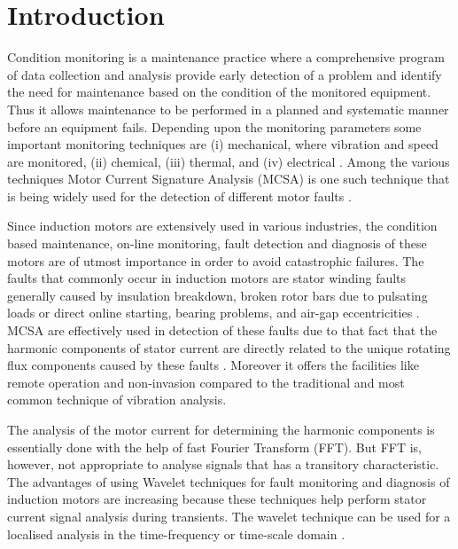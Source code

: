 \documentclass[conference]{IEEEtran}
\begin{document}
%
\IEEEpeerreviewmaketitle

\section{Introduction}
Condition monitoring is a maintenance practice where a comprehensive program of data collection and analysis provide early detection of a problem and identify the need for maintenance based on the condition of the monitored equipment. Thus it allows maintenance to be performed in a planned and systematic manner before an equipment fails. Depending upon the monitoring parameters some important monitoring techniques are (i) mechanical, where vibration and speed are monitored, (ii) chemical, (iii) thermal, and (iv) electrical \cite{Penman}. Among the various techniques Motor Current Signature Analysis (MCSA) is one such technique that is being widely used for the detection of different motor faults \cite{00897122-6}. 

Since induction motors are extensively used in various industries, the condition based maintenance, on-line monitoring, fault detection and diagnosis of these motors are of utmost importance in order to avoid catastrophic failures. The faults that commonly occur in induction motors are stator winding faults generally caused by insulation breakdown, broken rotor bars due to pulsating loads or direct online starting, bearing problems, and air-gap eccentricities \cite{rps6}. MCSA are effectively used in detection of these faults due to that fact that the harmonic components of stator current are directly related to the unique rotating flux components caused by these faults \cite{t32pg145}. Moreover it offers the facilities like remote operation and non-invasion compared to the traditional and most common technique of vibration analysis.

The analysis of the motor current for determining the harmonic components is essentially done with the help of fast Fourier Transform (FFT). But FFT is, however, not appropriate to analyse signals that has a transitory characteristic. The advantages of using Wavelet techniques for fault monitoring and diagnosis of induction motors are increasing because these techniques help perform stator current signal analysis during transients. The wavelet technique can be used for a localised analysis in the time-frequency or time-scale domain \cite{amara}. 
\end{document}
